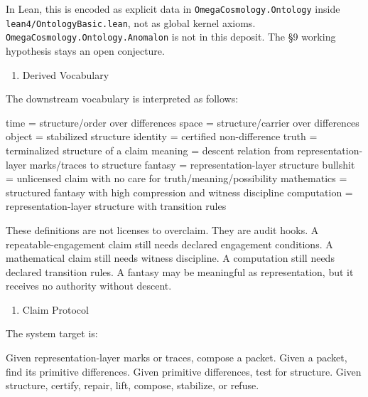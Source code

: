 \documentclass[
  10pt,
]{article}
\newenvironment{Shaded}{}{}
\newcommand{\NormalTok}[1]{#1}
\providecommand{\tightlist}{%
  \setlength{\itemsep}{0pt}\setlength{\parskip}{0pt}}
\providecommand{\tightlist}{%
  \setlength{\itemsep}{0pt}\setlength{\parskip}{0pt}}
\DeclareRobustCommand{\texttt}[1]{{\paperSymbolFont\nolinkurl{#1}}}
\begin{document}
In Lean, this is encoded as explicit data in \texttt{OmegaCosmology.Ontology} inside \texttt{lean4/OntologyBasic.lean}, not as global kernel axioms. \texttt{OmegaCosmology.Ontology.Anomalon} is not in this deposit. The §9 working hypothesis stays an open conjecture.

\begin{enumerate}
\def\labelenumi{\arabic{enumi}.}
\setcounter{enumi}{3}
\tightlist
\item
  Derived Vocabulary
\end{enumerate}

The downstream vocabulary is interpreted as follows:

\begin{Shaded}
\begin{Highlighting}[]
\NormalTok{time        = structure/order over differences}
\NormalTok{space       = structure/carrier over differences}
\NormalTok{object      = stabilized structure}
\NormalTok{identity    = certified non{-}difference}
\NormalTok{truth       = terminalized structure of a claim}
\NormalTok{meaning     = descent relation from representation{-}layer marks/traces to structure}
\NormalTok{fantasy     = representation{-}layer structure}
\NormalTok{bullshit    = unlicensed claim with no care for truth/meaning/possibility}
\NormalTok{mathematics = structured fantasy with high compression and witness discipline}
\NormalTok{computation = representation{-}layer structure with transition rules}
\end{Highlighting}
\end{Shaded}

These definitions are not licenses to overclaim. They are audit hooks. A repeatable-engagement claim still needs declared engagement conditions. A mathematical claim still needs witness discipline. A computation still needs declared transition rules. A fantasy may be meaningful as representation, but it receives no authority without descent.

\begin{enumerate}
\def\labelenumi{\arabic{enumi}.}
\setcounter{enumi}{4}
\tightlist
\item
  Claim Protocol
\end{enumerate}

The system target is:

\begin{Shaded}
\begin{Highlighting}[]
\NormalTok{Given representation{-}layer marks or traces, compose a packet.}
\NormalTok{Given a packet, find its primitive differences.}
\NormalTok{Given primitive differences, test for structure.}
\NormalTok{Given structure, certify, repair, lift, compose, stabilize, or refuse.}
\end{Highlighting}
\end{Shaded}
\end{document}
